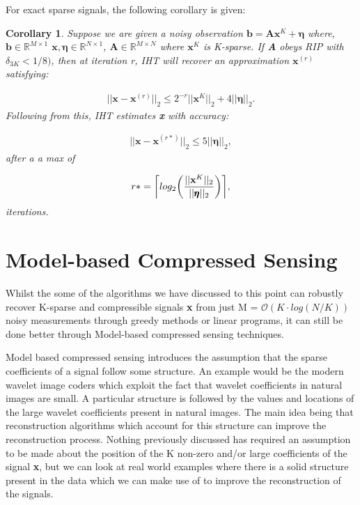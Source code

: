 \documentclass[titlepage,oneside, 12pt]{book}
\DeclarePairedDelimiter{\ceil}{\lceil}{\rceil}
\theoremstyle{break}
\begin{document}
For exact sparse signals, the following corollary is given:
\newpage
\newtheorem*{IHT2}{Corollary}
\begin{IHT2}
Suppose we are given a noisy observation $ \textbf{b} = \textbf{A}\textbf{x}^{K} + \pmb{\eta}$ where, $\textbf{b} \in \mathbb{R}^{M \times 1}$ $\textbf{x},\pmb{\eta} \in \mathbb{R}^{N \times 1}$, $\textbf{A} \in \mathbb{R}^{M \times N}$ where $\textbf{x}^{K}$ is K-sparse. If \textbf{A} obeys RIP with $\delta_{3K} < 1/8)$, then at iteration r, IHT will recover an approximation $\textbf{x}^{(r)}$ satisfying:

\begin{equation}
\begin{gathered}
||\textbf{x} - \textbf{x}^{(r)}||_{2} \leq 2^{-r}||\textbf{x}^{K}||_{2} + 4||\pmb{\eta}||_{2}.
\end{gathered}
\end{equation}\bigskip
Following from this, IHT estimates \textbf{x} with accuracy:

\begin{equation}
\begin{gathered}
||\textbf{x} - \textbf{x}^{(r*)}||_{2} \leq 5||\pmb{\eta}||_{2}, 
\end{gathered}
\end{equation}
after a a max of 

\begin{equation}
\begin{gathered}
r* = \ceil[\bigg]{log_{2}\bigg(\dfrac{||\textbf{x}^{K}||_{2}}{||\pmb{\eta}||_{2}}\bigg)},
\end{gathered}
\end{equation}\bigskip
iterations.

\end{IHT2}

\section{Model-based Compressed Sensing}

Whilst the some of the algorithms we have discussed to this point  can robustly recover K-sparse and compressible signals \textbf{x} from just M = $\mathcal{O}(K \cdot log(N/K))$ noisy measurements through greedy methods or linear programs, it can still be done better through Model-based compressed sensing techniques.  

Model based compressed sensing introduces the assumption that the sparse coefficients of a signal follow some structure. An example would be the modern wavelet image coders which exploit the fact that wavelet coefficients in natural images are small. A particular structure is followed by the values and locations of the large wavelet coefficients present in natural images. The main idea being that reconstruction algorithms which account for this structure can improve the reconstruction process\cite{MBCS}. Nothing previously discussed has required an assumption to be made about the position of the K non-zero and/or large coefficients of the signal \textbf{x}, but we can look at real world examples where there is a solid structure present in the data which we can make use of to improve the reconstruction of the signals. 
\end{document}

